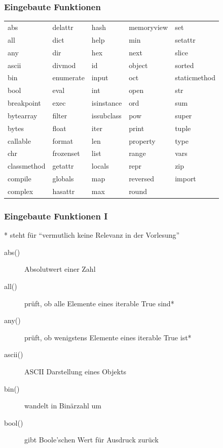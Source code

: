 \documentclass[ngerman]{beamer}
\begin{document}
\begin{frame}
\frametitle{Eingebaute Funktionen}

\begin{tabular}{lllll}
abs	&	delattr	&	hash	&	memoryview	&	set	\\
all	&	dict	&	help	&	min	&	setattr	\\
any	&	dir	&	hex	&	next	&	slice	\\
ascii	&	divmod	&	id	&	object	&	sorted	\\
bin	&	enumerate	&	input	&	oct	&	staticmethod	\\
bool	&	eval	&	int	&	open	&	str	\\
breakpoint	&	exec	&	isinstance	&	ord	&	sum	\\
bytearray	&	filter	&	issubclass	&	pow	&	super	\\
bytes	&	float	&	iter	&	print	&	tuple	\\
callable	&	format	&	len	&	property	&	type	\\
chr	&	frozenset	&	list	&	range	&	vars	\\
classmethod	&	getattr	&	locals	&	repr	&	zip	\\
compile	&	globals	&	map	&	reversed	&	\textunderscore \textunderscore import \textunderscore \textunderscore	\\
complex	&	hasattr	&	max	&	round	&		\\
\end{tabular}
\end{frame}

\begin{frame}
\frametitle{Eingebaute Funktionen I}

* steht für \enquote{vermutlich keine Relevanz in der Vorlesung}

\begin{description}
\item[abs()] Absolutwert einer Zahl
\item[all()] prüft, ob alle Elemente eines iterable True sind*
\item[any()] prüft, ob wenigstens Elemente eines iterable True ist*
\item[ascii()] ASCII Darstellung eines Objekts
\item[bin()] wandelt in Binärzahl um
\item[bool()] gibt Boole'schen Wert für Ausdruck zurück 
\end{description}
\end{frame}
\end{document}
